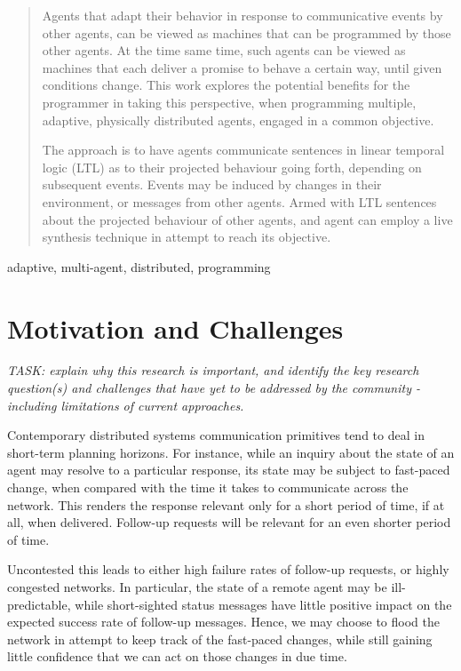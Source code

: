 \documentclass[conference]{IEEEtran}
\begin{document}
\begin{abstract}


Agents that adapt their behavior in response to communicative events
by other agents, can be viewed as machines that can be programmed by
those other agents. At the time same time, such agents can be viewed
as machines that each deliver a promise to behave a certain way, until
given conditions change. This work explores the potential benefits for
the programmer in taking this perspective, when programming multiple,
adaptive, physically distributed agents, engaged in a common
objective.

The approach is to have agents communicate sentences in linear
temporal logic (LTL) as to their projected behaviour going forth,
depending on subsequent events. Events may be induced by changes in
their environment, or messages from other agents. Armed with LTL
sentences about the projected behaviour of other agents, and agent can
employ a live synthesis technique in attempt to reach its objective.

\end{abstract}

\begin{IEEEkeywords}
adaptive, multi-agent, distributed, programming
\end{IEEEkeywords}

\section{Motivation and Challenges}

\emph{TASK: explain why this research is important, and identify the
key research question(s) and challenges that have yet to be addressed
by the community - including limitations of current approaches.}

Contemporary distributed systems communication primitives tend to deal
in short-term planning horizons. For instance, while an inquiry about
the state of an agent may resolve to a particular response, its state
may be subject to fast-paced change, when compared with the time it
takes to communicate across the network. This renders the response
relevant only for a short period of time, if at all, when delivered.
Follow-up requests will be relevant for an even shorter period of
time.

Uncontested this leads to either high failure rates of follow-up
requests, or highly congested networks. In particular, the state of a
remote agent may be ill-predictable, while short-sighted status
messages have little positive impact on the expected success rate of
follow-up messages. Hence, we may choose to flood the network in
attempt to keep track of the fast-paced changes, while still gaining
little confidence that we can act on those changes in due time.
\end{document}
